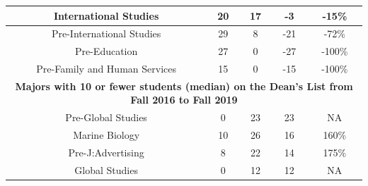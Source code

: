 \documentclass[10]{article}
\begin{document}
\begin{longtable}[c]{|ccccc|}
	\multicolumn{1}{|c|}{International Studies}                      & \multicolumn{1}{c|}{20}                              & \multicolumn{1}{c|}{17}                                  & \multicolumn{1}{c|}{-3}                 & -15\%                 \\ \hline
	\multicolumn{1}{|c|}{Pre-International Studies}                  & \multicolumn{1}{c|}{29}                              & \multicolumn{1}{c|}{8}                                   & \multicolumn{1}{c|}{-21}                & -72\%                 \\ \hline
	\multicolumn{1}{|c|}{Pre-Education}                              & \multicolumn{1}{c|}{27}                              & \multicolumn{1}{c|}{0}                                   & \multicolumn{1}{c|}{-27}                & -100\%                \\ \hline
	\multicolumn{1}{|c|}{Pre-Family and Human Services}              & \multicolumn{1}{c|}{15}                              & \multicolumn{1}{c|}{0}                                   & \multicolumn{1}{c|}{-15}                & -100\%                \\ \hline
	\multicolumn{5}{|c|}{\textbf{Majors with 10 or fewer students (median) on the Dean's List from Fall 2016 to Fall 2019}}                                                                                                                              \\ \hline
	\multicolumn{1}{|c|}{Pre-Global Studies}                         & \multicolumn{1}{c|}{0}                               & \multicolumn{1}{c|}{23}                                  & \multicolumn{1}{c|}{23}                 & NA                    \\ \hline
	\multicolumn{1}{|c|}{Marine Biology}                             & \multicolumn{1}{c|}{10}                              & \multicolumn{1}{c|}{26}                                  & \multicolumn{1}{c|}{16}                 & 160\%                 \\ \hline
	\multicolumn{1}{|c|}{Pre-J:Advertising}                          & \multicolumn{1}{c|}{8}                               & \multicolumn{1}{c|}{22}                                  & \multicolumn{1}{c|}{14}                 & 175\%                 \\ \hline
	\multicolumn{1}{|c|}{Global Studies}                             & \multicolumn{1}{c|}{0}                               & \multicolumn{1}{c|}{12}                                  & \multicolumn{1}{c|}{12}                 & NA                    \\ \hline

\end{longtable}
\end{document}
